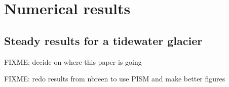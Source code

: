 \documentclass[11pt,final]{amsart}
\begin{document}
\section{Numerical results}  \label{sec:results}

\subsection*{Steady results for a tidewater glacier}

FIXME: decide on where this paper is going

FIXME: redo results from nbreen to use PISM and make better figures

\end{document}
